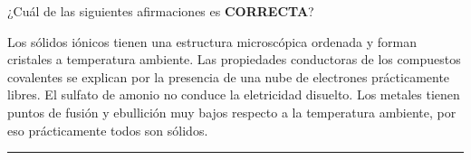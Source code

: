 \documentclass[a4paper,addpoints,14pt]{exam}
\newcommand*\chem[1]{\ensuremath{\mathrm{#1}}}
\newcommand{\halmos}{\vspace*{-4mm}
	
					\begin{flushright}
						\rule{1mm}{2.5mm} 
					\end{flushright}\vspace*{-4mm}
						
					  }
\renewcommand{\qed}{\halmos}
\begin{document}
	\begin{questions}
	
%			
		
	
	\begin{question}[1] ¿Cuál de las siguientes afirmaciones es \textbf{\small{CORRECTA}}?
		\begin{checkboxes}
			\CorrectChoice Los sólidos iónicos tienen una estructura microscópica ordenada y forman cristales a temperatura ambiente.
			\choice Las propiedades conductoras de los compuestos covalentes se explican por la presencia de una nube de electrones prácticamente libres.
			\choice  El sulfato de amonio no conduce la eletricidad disuelto.
			\choice Los metales tienen puntos de fusión y ebullición muy bajos respecto a la temperatura ambiente, por eso prácticamente todos son sólidos.
		\end{checkboxes}
	\end{question}
	\qed
	\vspace{-2ex}
	
		

	
%		
	

\end{questions}
\end{document}
